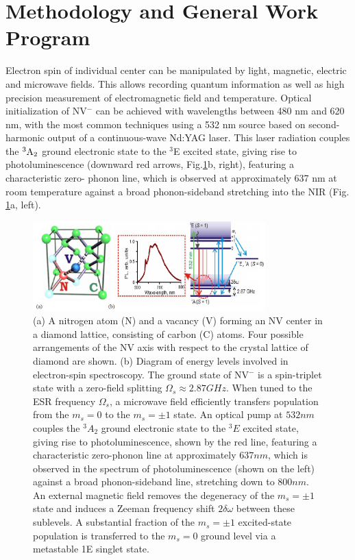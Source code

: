 \section{Methodology and General Work Program}
Electron spin of individual center can be manipulated by light, magnetic, electric and microwave fields. This
allows recording quantum information as well as high precision measurement of electromagnetic field and
temperature. Optical initialization of NV$^-$ can be achieved with wavelengths between 480 nm and 620
nm, with the most common techniques using a 532 nm source based on second-harmonic output of a continuous-wave 
Nd:YAG laser. This laser radiation couples the $^3\textnormal{A}_2$ ground electronic state to the $^3$E excited 
state, giving rise to
photoluminescence (downward red arrows, Fig.\ref{NVBackgroundFig}b, right), featuring a characteristic zero-
phonon line, which is
observed at approximately 637 nm at room temperature against a broad phonon-sideband stretching into the NIR 
(Fig. \ref{NVBackgroundFig}a, left).

\begin{figure}
\centering
\includegraphics[width=0.8\textwidth]{Figures/NVBackgroundFigure.png}
\caption{(a) A nitrogen atom (N) and a vacancy (V) forming an NV center in a diamond lattice, consisting of carbon
(C) atoms. Four possible arrangements of the NV axis with respect to the crystal lattice of diamond are shown. (b)
Diagram of energy levels involved in electron-spin spectroscopy. The ground state of NV$^-$ is a
spin-triplet state with a zero-field splitting $\Omega_s\approx2.87\unit{GHz}$. When tuned to the ESR frequency $\Omega_s$, a microwave
field efficiently transfers population from the $m_s = 0$ to the $m_s = \pm1$ state. An optical pump at $532\unit{nm}$ couples
the $^{3}A_{2}$ ground electronic state to the $^{3}E$ excited state, giving rise to photoluminescence, shown by the red line,
featuring a characteristic zero-phonon line at approximately $637\unit{nm}$, which is observed in the spectrum of
photoluminescence (shown on the left) against a broad phonon-sideband line, stretching down to $800\unit{nm}$. An
external magnetic field removes the degeneracy of the $m_s = \pm1$ state and induces a Zeeman frequency shift
$2\delta\omega$ between these
sublevels. A substantial fraction of the $m_s = \pm1$ excited-state population is transferred to the $m_s = 0$
ground level via a metastable 1E singlet state.}
\label{NVBackgroundFig}
\end{figure}

